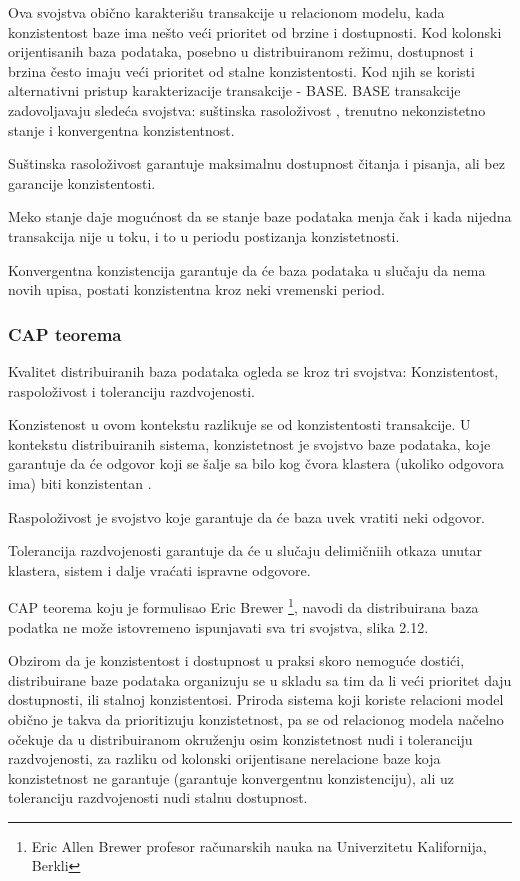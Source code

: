 \documentclass[12pt,oneside]{memoir}
\begin{document}
Ova svojstva obično karakterišu transakcije u relacionom modelu, kada konzistentost baze ima nešto veći prioritet od brzine i dostupnosti. Kod kolonski orijentisanih baza podataka, posebno u distribuiranom režimu, dostupnost i brzina često imaju veći prioritet od stalne konzistentosti. Kod njih se koristi alternativni pristup karakterizacije transakcije - BASE. BASE transakcije zadovoljavaju sledeća svojstva: suštinska rasoloživost , trenutno nekonzistetno stanje i konvergentna konzistentnost.

Suštinska rasoloživost  garantuje maksimalnu dostupnost čitanja i pisanja, ali bez garancije konzistentosti.

Meko stanje daje mogućnost da se stanje baze podataka menja čak i kada nijedna transakcija nije u toku, i to u periodu postizanja konzistetnosti.

Konvergentna konzistencija garantuje da će baza podataka u slučaju da nema novih upisa, postati konzistentna kroz neki vremenski period. 

\subsubsection{CAP teorema}

Kvalitet distribuiranih baza podataka ogleda se kroz tri svojstva: Konzistentost, raspoloživost i toleranciju razdvojenosti.

Konzistenost u ovom kontekstu razlikuje se od konzistentosti transakcije. U kontekstu distribuiranih sistema, konzistetnost je svojstvo baze podataka, koje garantuje da će odgovor koji se šalje sa bilo kog čvora klastera (ukoliko odgovora ima) biti konzistentan .

Raspoloživost je svojstvo koje garantuje da će baza uvek vratiti neki odgovor.

Tolerancija razdvojenosti garantuje da će u slučaju delimičniih otkaza unutar klastera, sistem i dalje vraćati ispravne odgovore.

CAP teorema koju je formulisao Eric Brewer  \footnote{Eric Allen Brewer profesor računarskih nauka na Univerzitetu Kalifornija, Berkli}, navodi da distribuirana baza podatka ne može istovremeno ispunjavati sva tri svojstva, slika 2.12.

Obzirom da je konzistentost i dostupnost u praksi skoro nemoguće dostići, distribuirane baze podataka organizuju se u skladu sa tim da li veći prioritet daju dostupnosti, ili stalnoj konzistentosi. Priroda sistema koji koriste relacioni model obično je takva da  prioritizuju konzistetnost, pa se od relacionog modela načelno očekuje da u distribuiranom okruženju osim konzistetnost nudi i toleranciju razdvojenosti, za razliku od kolonski orijentisane nerelacione baze koja konzistetnost ne garantuje (garantuje konvergentnu konzistenciju), ali uz toleranciju razdvojenosti nudi stalnu dostupnost.
\end{document}
